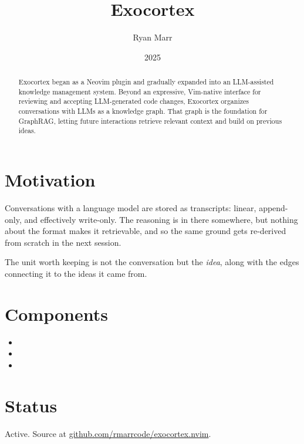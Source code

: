 \documentclass{article}
\title{Exocortex}
\author{Ryan Marr}
\date{2025}
\begin{document}
\maketitle

\begin{abstract}
Exocortex began as a Neovim plugin and gradually expanded into an LLM-assisted
knowledge management system. Beyond an expressive, Vim-native interface for
reviewing and accepting LLM-generated code changes, Exocortex organizes
conversations with LLMs as a knowledge graph. That graph is the foundation for
GraphRAG, letting future interactions retrieve relevant context and build on
previous ideas.
\end{abstract}

\section{Motivation}

Conversations with a language model are stored as transcripts: linear, append-only,
and effectively write-only. The reasoning is in there somewhere, but nothing about
the format makes it retrievable, and so the same ground gets re-derived from scratch
in the next session.

The unit worth keeping is not the conversation but the \emph{idea}, along with the
edges connecting it to the ideas it came from.

\section{Components}

\begin{itemize}
  \item {}

  \item {}

  \item {}
\end{itemize}

\section{Status}

Active. Source at
\href{https://github.com/rmarrcode/exocortex.nvim}{github.com/rmarrcode/exocortex.nvim}.
\end{document}
